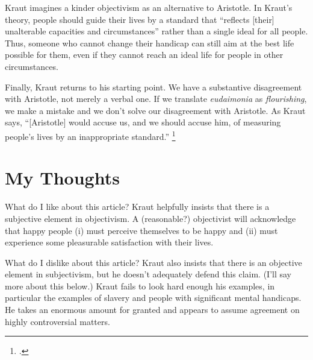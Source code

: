 \documentclass[12pt,letterpaper]{article}
\begin{document}
Kraut imagines a kinder objectivism as an alternative to Aristotle.
In Kraut's theory, people should guide their lives by a standard that ``reflects [their] unalterable capacities and circumstances'' rather than a single ideal for all people.
Thus, someone who cannot change their handicap can still aim at the best life possible for them, even if they cannot reach an ideal life for people in other circumstances.

Finally, Kraut returns to his starting point.
We have a substantive disagreement with Aristotle, not merely a verbal one.
If we translate \textit{eudaimonia} as \textit{flourishing}, we make a mistake and we don't solve our disagreement with Aristotle.
As Kraut says, ``[Aristotle] would accuse us, and we should accuse him, of measuring people's lives by an inappropriate standard.''%
\footcite[][197]{two-conceptions-of-happiness-kraut-1979}

\section*{My Thoughts}

What do I like about this article?
Kraut helpfully insists that there is a subjective element in objectivism.
A (reasonable?) objectivist will acknowledge that happy people (i) must perceive themselves to be happy and (ii) must experience some pleasurable satisfaction with their lives.


What do I dislike about this article?
Kraut also insists that there is an objective element in subjectivism, but he doesn't adequately defend this claim.
(I'll say more about this below.)
Kraut fails to look hard enough his examples, in particular the examples of slavery and people with significant mental handicaps.
He takes an enormous amount for granted and appears to assume agreement on highly controversial matters.
\end{document}
